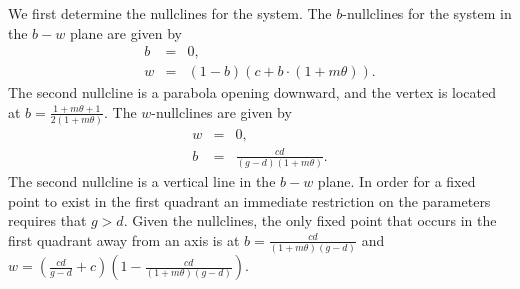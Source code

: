 \documentclass[12pt]{article}
\begin{document}
We first determine the nullclines for the system.
The $b$-nullclines for the system in the $b-w$ plane are given by
\begin{eqnarray}
  \label{eq:bnullclines}
  b & = & 0, \\
  w & = & (1-b)(c+b\cdot(1+m\theta)).
\end{eqnarray}
The second nullcline is a parabola opening downward, and the vertex is located at
$b=\frac{1+m\theta+1}{2(1+m\theta)}$. The $w$-nullclines are given by
\begin{eqnarray}
  \label{eq:wnullclines}
  w & = & 0, \\
  b & = & \frac{cd}{(g-d)(1+m\theta)}.
\end{eqnarray}
The second nullcline is a vertical line in the $b-w$ plane. In order
for a fixed point to exist in the first quadrant an immediate
restriction on the parameters requires that $g>d$.  Given the
nullclines, the only fixed point that occurs in the first quadrant
away from an axis is at $b=\frac{cd}{(1+m\theta)(g-d)}$ and
$w=\left(\frac{cd}{g-d}+c\right)
\left(1-\frac{cd}{(1+m\theta)(g-d)}\right)$.
\end{document}
